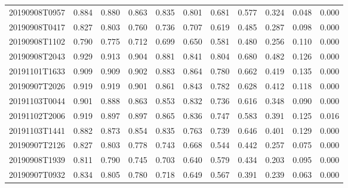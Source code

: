 \begin{table}[!ht]
{\begin{tabular}{ccccccccccc}
			20190908T0957 &          0.884 &          0.880 &          0.863 &          0.835 &          0.801 &          0.681 &          0.577 &          0.324 &          0.048 &          0.000 \\
			20190908T0417 &          0.827 &          0.803 &          0.760 &          0.736 &          0.707 &          0.619 &          0.485 &          0.287 &          0.098 &          0.000 \\
			20190908T1102 &          0.790 &          0.775 &          0.712 &          0.699 &          0.650 &          0.581 &          0.480 &          0.256 &          0.110 &          0.000 \\
			20190908T2043 &          0.929 &          0.913 &          0.904 &          0.881 &          0.841 &          0.804 &          0.680 &          0.482 &          0.126 &          0.000 \\
			20191101T1633 &          0.909 &          0.909 &          0.902 &          0.883 &          0.864 &          0.780 &          0.662 &          0.419 &          0.135 &          0.000 \\
			20190907T2026 &          0.919 &          0.919 &          0.901 &          0.861 &          0.843 &          0.782 &          0.628 &          0.412 &          0.118 &          0.000 \\
			20191103T0044 &          0.901 &          0.888 &          0.863 &          0.853 &          0.832 &          0.736 &          0.616 &          0.348 &          0.090 &          0.000 \\
			20191102T2006 &          0.919 &          0.897 &          0.897 &          0.865 &          0.836 &          0.747 &          0.583 &          0.391 &          0.125 &          0.016 \\
			20191103T1441 &          0.882 &          0.873 &          0.854 &          0.835 &          0.763 &          0.739 &          0.646 &          0.401 &          0.129 &          0.000 \\
			20190907T2126 &          0.827 &          0.803 &          0.778 &          0.743 &          0.668 &          0.544 &          0.442 &          0.257 &          0.075 &          0.000 \\
			20190908T1939 &          0.811 &          0.790 &          0.745 &          0.703 &          0.640 &          0.579 &          0.434 &          0.203 &          0.095 &          0.000 \\
			20190907T0932 &          0.834 &          0.805 &          0.780 &          0.718 &          0.649 &          0.567 &          0.391 &          0.239 &          0.063 &          0.000 \\

\end{tabular}}
\end{table}
